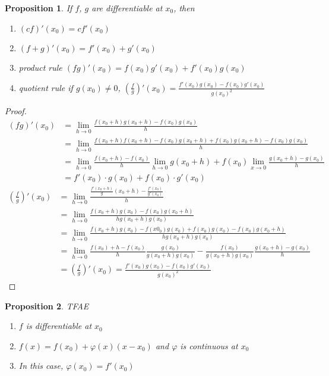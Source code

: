 \documentclass[12pt]{article}
\theoremstyle{plain}
\newtheorem{proposition}{Proposition}[subsection]
\renewcommand{\phi}{\varphi}
\newcommand{\dlim}{\displaystyle\lim\limits}
\begin{document}
     \begin{proposition}
     	If $f$, $g$ are differentiable at $x_0$, then 
     	\begin{enumerate}
     	 	\item $(cf)'(x_0) = cf'(x_0)$

     	 	\item $(f+g)'(x_0)= f'(x_0)+g'(x_0)$

     	 	\item product rule  $(fg)'(x_0) = f(x_0)g'(x_0)+f'(x_0)g(x_0)$

     	 	\item quotient rule if $g(x_0) \neq 0$,
     	 		$(\frac fg)'(x_0) =\frac{f'(x_0) g(x_0) -f(x_0) g'(x_0)}{g(x_0)^2}$
     	 		
     	\end{enumerate}
    \end{proposition}
    \begin{proof}
        \begin{align*}
            (fg)'(x_0) &= \dlim_{h\to 0} \frac{f(x_0+h)g(x_0+h) -f(x_0) g(x_0)}{h}\\
            &=\dlim_{h\to 0} \frac{f(x_0+h)f(x_0+h)-f(x_0)g(x_0+h)
            +f(x_0)g(x_0+h)-f(x_0)g(x_0)}{h}\\
            &=\dlim_{h\to 0} \frac{f(x_0+h)-f(x_0)}h \dlim_{h\to 0}g(x_0+h)+
            f(x_0) \dlim_{x\to 0} \frac{g(x_0+h)-g(x_0)}h\\
            &=f'(x_0)\cdot g(x_0) + f(x_0)\cdot g'(x_0)
        \end{align*}
        \begin{align*}
            (\frac fg)'(x_0) 
            &=\dlim_{h\to 0} \frac{\frac{f'(x_0+h)}g(x_0+h)-\frac{f'(x_0)}{g'(x_0)}}h\\
            &=\dlim_{h\to 0} \frac{f(x_0+h)g(x_0)-f(x_0)g(x_0+h)}{hg(x_0+h)g(x_0)}\\
            &=\dlim_{h\to 0} \frac{f(x_0+h)g(x_0)-f(x0_0)g(x_0)+f(x_0)g(x_0)-f(x_0) g(x_0+h)}
            {hg(x_0+h) g(x_0)}\\
            &=\dlim_{h\to 0} \frac{f(x_0)+h-f(x_0)}h \frac{g(x_0)}{g(x_0+h)g(x_0)}
            -\frac{f(x_0)}{g(x_0+h)g(x_0)} \frac{g(x_0+h)-g(x_0)}h \\
            &=(\frac fg)'(x_0) =\frac{f'(x_0) g(x_0) -f(x_0) g'(x_0)}{g(x_0)^2}
        \end{align*}
    \end{proof}
    \newpage
    \begin{proposition} TFAE
        \begin{enumerate}
            \item $f$ is differentiable at $x_0$\\
            \item $f(x) =f(x_0) +\phi (x)(x-x_0)$ and $\phi$ is continuous at $x_0$\\
            \item In this case, $\phi(x_0) = f'(x_0)$
        \end{enumerate}
    \end{proposition}
\end{document}

